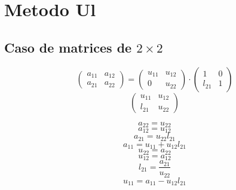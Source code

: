 \documentclass[10pt,a4paper,dvipdfmx]{article}
\begin{document}
\section{Metodo Ul}
\subsection{Caso de matrices de $2\times 2$ }
$$ \left( 
\begin{array}{cc}
a_{{1}{1}} & a_{{1}{2}} \\
a_{{2}{1}} & a_{{2}{2}} 
 \end{array}
\right)
 = \left( 
\begin{array}{cc}
u_{{1}{1}} & u_{{1}{2}} \\
0 & u_{{2}{2}} 
 \end{array}
\right)
 \cdot \left( 
\begin{array}{cc}
1 & 0 \\
l_{{2}{1}} & 1 
 \end{array}
\right)
 $$
$$ \left( 
\begin{array}{cc}
u_{{1}{1}} & u_{{1}{2}} \\
l_{{2}{1}} & u_{{2}{2}} 
 \end{array}
\right)
 $$
\begin{multicols}{2}
$$ a_{{2}{2}} = u_{{2}{2}} $$
$$ a_{{1}{2}} = u_{{1}{2}} $$
$$ a_{{2}{1}} = u_{{2}{2}} l_{{2}{1}} $$
$$ a_{{1}{1}} = u_{{1}{1}} + u_{{1}{2}} l_{{2}{1}} $$
\vfill\null
\columnbreak
$$ u_{{2}{2}} = a_{{2}{2}} $$
$$ u_{{1}{2}} = a_{{1}{2}} $$
$$ l_{{2}{1}} = \dfrac{a_{{2}{1}}}{u_{{2}{2}}} $$
$$ u_{{1}{1}} = a_{{1}{1}}- u_{{1}{2}} l_{{2}{1}} $$
\end{multicols}
\end{document}
